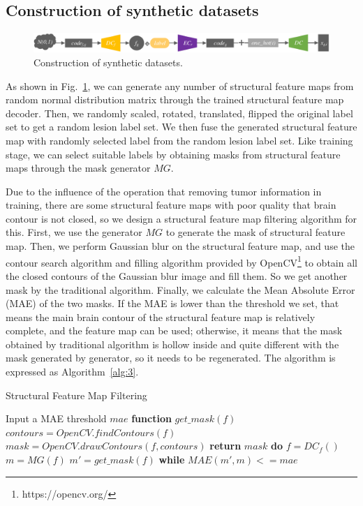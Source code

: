 \documentclass{ecai}
\begin{document}
\subsection{Construction of synthetic datasets}
\label{make dataset}
\begin{figure}
	\centering
	\includegraphics[width=1.98\columnwidth]{figures/make_data}
	\caption{Construction of synthetic datasets.}
	\label{make_data}
\end{figure}
As shown in Fig.~\ref{make_data}, we can generate any number of structural feature maps from random normal distribution matrix through the trained structural feature map decoder. Then, we randomly scaled, rotated, translated, flipped the original label set to get a random lesion label set. We then fuse the generated structural feature map with randomly selected label from the random lesion label set. Like training stage, we can select suitable labels by obtaining masks from structural feature maps through the mask generator $MG$.

Due to the influence of the operation that removing tumor information in training, there are some structural feature maps with poor quality that brain contour is not closed, so we design a structural feature map filtering algorithm for this. First, we use the generator $MG$ to generate the mask of structural feature map. Then, we perform Gaussian blur\cite{92wink2004denoising} on the structural feature map, and use the contour search algorithm and filling algorithm provided by OpenCV\footnote{https://opencv.org/} to obtain all the closed contours of the Gaussian blur image and fill them. So we get another mask by the traditional algorithm. Finally, we calculate the Mean Absolute Error (MAE) of the two masks. If the MAE is lower than the threshold we set, that means the main brain contour of the structural feature map is relatively complete, and the feature map can be used; otherwise, it means that the mask obtained by traditional algorithm is hollow inside and quite different with the mask generated by generator, so it needs to be regenerated. The algorithm is expressed as Algorithm~\ref{alg:3}.
\begin{algorithm}
	\caption{Structural Feature Map Filtering}
	\label{alg:3}
	\begin{algorithmic}[1]
		\State Input a MAE threshold $mae$
		\State \textbf{function} $get\_mask(f)$
		\State \indent$contours = OpenCV.findContours(f)$
		\State \indent$mask =OpenCV.drawContours(f,contours)$
		\State \indent\textbf{return} $mask$
		\State \textbf{do} 
		\State \indent$f = DC_f()$
		\State \indent$m = MG(f)$
		\State \indent$m'= get\_mask(f)$
		\State \textbf{while} $MAE(m',m) <= mae$
	\end{algorithmic}  
\end{algorithm}
\end{document}
